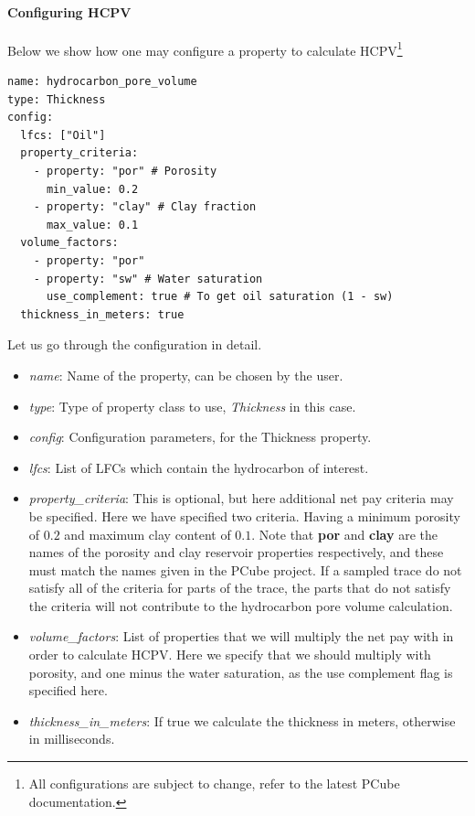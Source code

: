 \documentclass[note,screen,english,12pt,utf8]{nrdoc}
\begin{document}
\paragraph{Configuring HCPV}

Below we show how one may configure a property to calculate HCPV\footnote{
    All configurations are subject to change, refer to the latest PCube documentation.
}
\begin{verbatim}
name: hydrocarbon_pore_volume
type: Thickness
config:
  lfcs: ["Oil"]
  property_criteria:
    - property: "por" # Porosity
      min_value: 0.2
    - property: "clay" # Clay fraction
      max_value: 0.1
  volume_factors:
    - property: "por"
    - property: "sw" # Water saturation
      use_complement: true # To get oil saturation (1 - sw)
  thickness_in_meters: true
\end{verbatim}

Let us go through the configuration in detail.
\begin{itemize}
    \item \emph{name}: Name of the property, can be chosen by the user.
    \item{\emph{type}: Type of property class to use, \emph{Thickness} in this case.}
    \item \emph{config}: Configuration parameters, for the Thickness property.
    \item \emph{lfcs}: List of LFCs which contain the hydrocarbon of interest.
    \item {
        \emph{property\_criteria}: This is optional, but here additional net pay criteria may be
        specified. Here we have specified two criteria. Having a minimum porosity of $0.2$
        and maximum clay content of $0.1$. Note that \textbf{por} and \textbf{clay} are the names
        of the porosity and clay reservoir properties respectively, and these must
        match the names given in the PCube project. If a sampled trace do not satisfy
        all of the criteria for parts of the trace, the parts that do not satisfy the
        criteria will not contribute to the hydrocarbon pore volume calculation.
    }
    \item {
        \emph{volume\_factors}: List of properties that we will multiply the
        net pay with in order to calculate HCPV. Here we specify that
        we should multiply with porosity, and one minus the water saturation,
        as the use complement flag is specified here.
    }
    \item \emph{thickness\_in\_meters}: If true we calculate the thickness in meters, otherwise in milliseconds.
\end{itemize}
\end{document}
